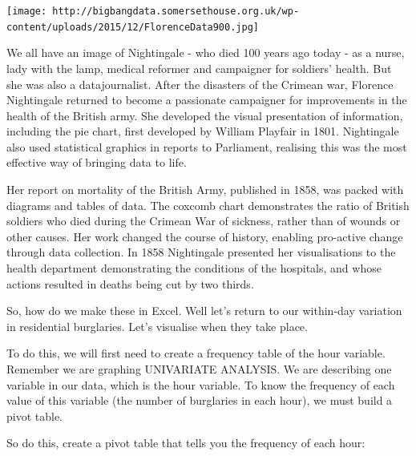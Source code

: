 \documentclass[]{book}
\theoremstyle{definition}
\theoremstyle{definition}
\theoremstyle{definition}
\theoremstyle{remark}
\begin{document}
\texttt{[image: http://bigbangdata.somersethouse.org.uk/wp-content/uploads/2015/12/FlorenceData900.jpg]}

We all have an image of Nightingale - who died 100 years ago today - as
a nurse, lady with the lamp, medical reformer and campaigner for
soldiers' health. But she was also a datajournalist. After the disasters
of the Crimean war, Florence Nightingale returned to become a passionate
campaigner for improvements in the health of the British army. She
developed the visual presentation of information, including the pie
chart, first developed by William Playfair in 1801. Nightingale also
used statistical graphics in reports to Parliament, realising this was
the most effective way of bringing data to life.

Her report on mortality of the British Army, published in 1858, was
packed with diagrams and tables of data. The coxcomb chart demonstrates
the ratio of British soldiers who died during the Crimean War of
sickness, rather than of wounds or other causes. Her work changed the
course of history, enabling pro-active change through data collection.
In 1858 Nightingale presented her visualisations to the health
department demonstrating the conditions of the hospitals, and whose
actions resulted in deaths being cut by two thirds.

 So, how do we make these in Excel. Well let's return to our within-day
variation in residential burglaries. Let's visualise when they take
place.

To do this, we will first need to create a frequency table of the hour
variable. Remember we are graphing UNIVARIATE ANALYSIS. We are
describing one variable in our data, which is the hour variable. To know
the frequency of each value of this variable (the number of burglaries
in each hour), we must build a pivot table.

So do this, create a pivot table that tells you the frequency of each
hour:
\end{document}
